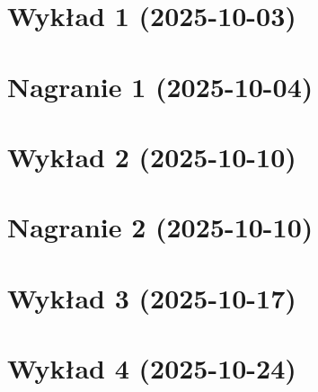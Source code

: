\documentclass[12pt, a4paper, polish, openany]{book}
\begin{document}
\frontmatter



\tableofcontents


\titleformat{\chapter}[display]{\normalfont\Huge\bfseries}{}{0pt}{\Huge}
\titlespacing*{\chapter}{0pt}{0pt}{20pt}

\mainmatter

\chapter{Wykład 1 (2025-10-03)}


\chapter{Nagranie 1 (2025-10-04)}


\chapter{Wykład 2 (2025-10-10)}


\chapter{Nagranie 2 (2025-10-10)}


\chapter{Wykład 3 (2025-10-17)}


\chapter{Wykład 4 (2025-10-24)}

\end{document}
